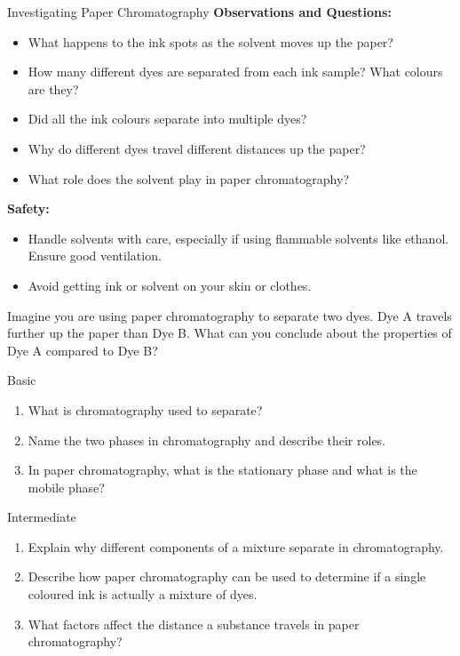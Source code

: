 \begin{investigation}{Investigating Paper Chromatography}
\textbf{Observations and Questions:}
\begin{itemize}
    \item What happens to the ink spots as the solvent moves up the paper?
    \item How many different dyes are separated from each ink sample? What colours are they?
    \item Did all the ink colours separate into multiple dyes?
    \item Why do different dyes travel different distances up the paper?
    \item What role does the solvent play in paper chromatography?
\end{itemize}

\textbf{Safety:}
\begin{itemize}
    \item Handle solvents with care, especially if using flammable solvents like ethanol. Ensure good ventilation.
    \item Avoid getting ink or solvent on your skin or clothes.
\end{itemize}
\end{investigation}

\begin{stopandthink}
Imagine you are using paper chromatography to separate two dyes. Dye A travels further up the paper than Dye B. What can you conclude about the properties of Dye A compared to Dye B?
\end{stopandthink}

\begin{tieredquestions}{Basic}
\begin{enumerate}
    \item What is chromatography used to separate?
    \item Name the two phases in chromatography and describe their roles.
    \item In paper chromatography, what is the stationary phase and what is the mobile phase?
\end{enumerate}
\end{tieredquestions}

\begin{tieredquestions}{Intermediate}
\begin{enumerate}
    \item Explain why different components of a mixture separate in chromatography.
    \item Describe how paper chromatography can be used to determine if a single coloured ink is actually a mixture of dyes.
    \item  What factors affect the distance a substance travels in paper chromatography?
\end{enumerate}
\end{tieredquestions}

